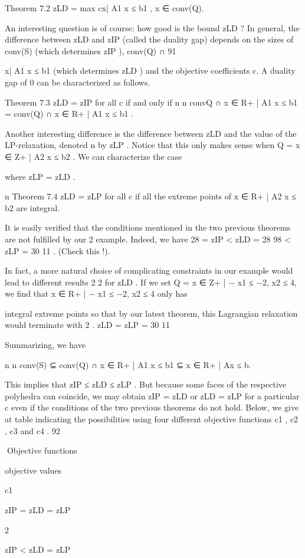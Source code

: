 Theorem 7.2
zLD = max {cx| A1 x ≤ b1 , x ∈ conv(Q)}.

An interesting question is of course: how good is the bound zLD ? In general, the difference between
zLD and zIP (called the duality gap) depends on the sizes of conv(S) (which determines zIP ), conv(Q) ∩
91

{x| A1 x ≤ b1 } (which determines zLD ) and the objective coefficients c. A duality gap of 0 can be
characterized as follows.

Theorem 7.3 zLD = zIP for all c if and only if
n
n
conv{Q ∩ {x ∈ R+
| A1 x ≤ b1 }} = conv(Q) ∩ {x ∈ R+
| A1 x ≤ b1 }.

Another interesting difference is the difference between zLD and the value of the LP-relaxation, denoted
n
by zLP . Notice that this only makes sense when Q = {x ∈ Z+
| A2 x ≤ b2 }. We can characterize the case

where zLP = zLD .

n
Theorem 7.4 zLD = zLP for all c if all the extreme points of {x ∈ R+
| A2 x ≤ b2 } are integral.

It is easily verified that the conditions mentioned in the two previous theorems are not fulfilled by our
2
example. Indeed, we have 28 = zIP < zLD = 28 98 < zLP = 30 11
. (Check this !).

In fact, a more natural choice of complicating constraints in our example would lead to different results
2
2
for zLD . If we set Q = {x ∈ Z+
| − x1 ≤ −2, x2 ≤ 4}, we find that {x ∈ R+
| − x1 ≤ −2, x2 ≤ 4} only has

integral extreme points so that by our latest theorem, this Lagrangian relaxation would terminate with
2
.
zLD = zLP = 30 11

Summarizing, we have

n
n
conv(S) ⊆ conv(Q) ∩ {x ∈ R+
| A1 x ≤ b1 } ⊆ {x ∈ R+
| Ax ≤ b}.

This implies that zIP ≤ zLD ≤ zLP . But because some faces of the respective polyhedra can coincide,
we may obtain zIP = zLD or zLD = zLP for a particular c even if the conditions of the two previous
theorems do not hold. Below, we give at table indicating the possibilities using four different objective
functions c1 , c2 , c3 and c4 .
92

Objective functions

objective values

c1

zIP = zLD = zLP

2

zIP < zLD = zLP

